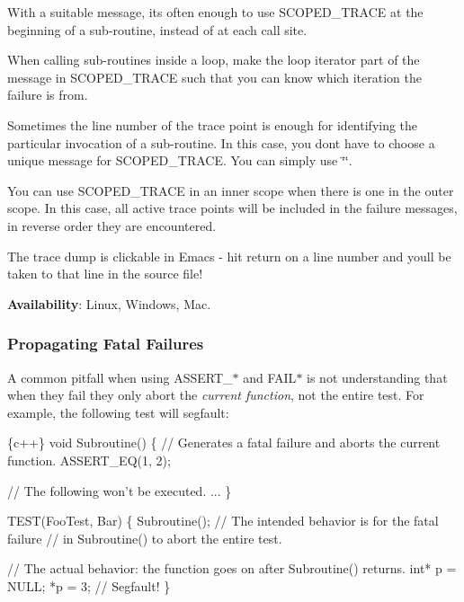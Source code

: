 \begin{DoxyEnumerate}
\item With a suitable message, it\textquotesingle{}s often enough to use {\ttfamily S\+C\+O\+P\+E\+D\+\_\+\+T\+R\+A\+CE} at the beginning of a sub-\/routine, instead of at each call site.
\item When calling sub-\/routines inside a loop, make the loop iterator part of the message in {\ttfamily S\+C\+O\+P\+E\+D\+\_\+\+T\+R\+A\+CE} such that you can know which iteration the failure is from.
\item Sometimes the line number of the trace point is enough for identifying the particular invocation of a sub-\/routine. In this case, you don\textquotesingle{}t have to choose a unique message for {\ttfamily S\+C\+O\+P\+E\+D\+\_\+\+T\+R\+A\+CE}. You can simply use {\ttfamily \char`\"{}\char`\"{}}.
\item You can use {\ttfamily S\+C\+O\+P\+E\+D\+\_\+\+T\+R\+A\+CE} in an inner scope when there is one in the outer scope. In this case, all active trace points will be included in the failure messages, in reverse order they are encountered.
\item The trace dump is clickable in Emacs -\/ hit {\ttfamily return} on a line number and you\textquotesingle{}ll be taken to that line in the source file!
\end{DoxyEnumerate}

{\bfseries Availability}\+: Linux, Windows, Mac.

\subsubsection*{Propagating Fatal Failures}

A common pitfall when using {\ttfamily A\+S\+S\+E\+R\+T\+\_\+$\ast$} and {\ttfamily F\+A\+I\+L$\ast$} is not understanding that when they fail they only abort the {\itshape current function}, not the entire test. For example, the following test will segfault\+:


\begin{DoxyCode}
\{c++\}
void Subroutine() \{
  // Generates a fatal failure and aborts the current function.
  ASSERT\_EQ(1, 2);

  // The following won't be executed.
  ...
\}

TEST(FooTest, Bar) \{
  Subroutine();  // The intended behavior is for the fatal failure
                 // in Subroutine() to abort the entire test.

  // The actual behavior: the function goes on after Subroutine() returns.
  int* p = NULL;
  *p = 3;  // Segfault!
\}
\end{DoxyCode}



